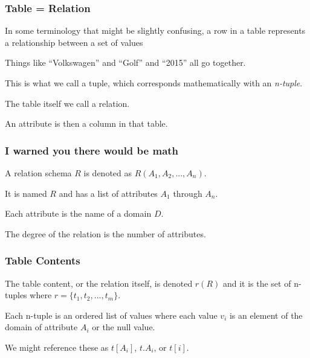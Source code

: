 \begin{frame}
\frametitle{Table = Relation}

In some terminology that might be slightly confusing, a row in a table represents a \alert{relationship} between a set of values 

Things like ``Volkswagen'' and ``Golf'' and ``2015'' all go together. 

This is what we call a \alert{tuple}, which corresponds mathematically with an \textit{n-tuple}.

The table itself we call a \alert{relation}. 

An \alert{attribute} is then a column in that table. 

\end{frame}



\begin{frame}
\frametitle{I warned you there would be math}

A relation schema $R$ is denoted as $R(A_{1}, A_{2}, ..., A_{n})$. 

It is named $R$ and has a list of attributes $A_{1}$ through $A_{n}$. 

Each attribute is the name of a domain $D$. 

The degree of the relation is the number of attributes. 

\end{frame}



\begin{frame}
\frametitle{Table Contents}

The table content, or the relation itself, is denoted $r(R)$ and it is the set of n-tuples where $r = \{t_{1}, t_{2}, ..., t_{m}\}$. 

Each n-tuple is an ordered list of values where each value $v_{i}$ is an element of the domain of attribute $A_{i}$ or the null value. 

We might reference these as $t[A_{i}]$, $t.A_{i}$, or $t[i]$. 

\end{frame}



